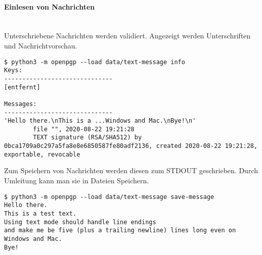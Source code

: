 \documentclass[12pt]{article}
\begin{document}
\paragraph{Einlesen von Nachrichten}~\\
Unterschriebene Nachrichten werden validiert.
Angezeigt werden Unterschriften und Nachrichtvorschau.
\begin{lstlisting}
$ python3 -m openpgp --load data/text-message info
Keys:
------------------------------
[entfernt]

Messages:
------------------------------
'Hello there.\nThis is a ...Windows and Mac.\nBye!\n'
        file "", 2020-08-22 19:21:28
        TEXT signature (RSA/SHA512) by 0bca1709a0c297a5fa8e8e6850587fe80adf2136, created 2020-08-22 19:21:28, exportable, revocable
\end{lstlisting}
Zum Speichern von Nachrichten werden diesen zum STDOUT geschrieben.
Durch Umleitung kann man sie in Dateien Speichern.
\begin{lstlisting}
$ python3 -m openpgp --load data/text-message save-message
Hello there.
This is a test text.
Using text mode should handle line endings
and make me be five (plus a trailing newline) lines long even on Windows and Mac.
Bye!
\end{lstlisting}
\end{document}
